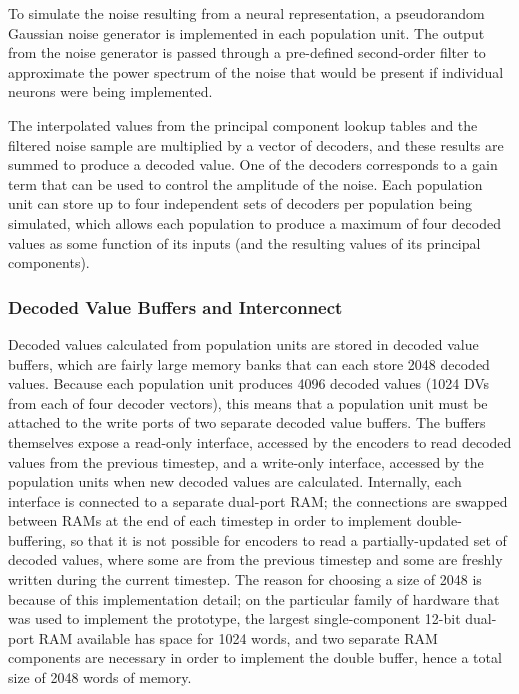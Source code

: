 \documentclass[english]{article}
\begin{document}
To simulate the noise resulting from a neural representation, a pseudorandom Gaussian noise generator is implemented in each population unit.
The output from the noise generator is passed through a pre-defined second-order filter to approximate the power spectrum of the noise
that would be present if individual neurons were being implemented. %

The interpolated values from the principal component lookup tables and the filtered noise sample are multiplied by a vector of decoders,
and these results are summed to produce a decoded value. %
One of the decoders corresponds to a gain term that can be used to control the amplitude of the noise.
Each population unit can store up to four independent sets of decoders per population being simulated,
which allows each population to produce a maximum of four decoded values as some function of its inputs
(and the resulting values of its principal components).

\subsubsection{Decoded Value Buffers and Interconnect}

Decoded values calculated from population units are stored in decoded value buffers, which are fairly large memory banks that can each
store 2048 decoded values. 
Because each population unit produces 4096 decoded values (1024 DVs from each of four decoder vectors),
this means that a population unit must be attached to the write ports of two separate decoded value buffers.
The buffers themselves expose a read-only interface, accessed by the encoders to read decoded values from the
previous timestep, and a write-only interface, accessed by the population units when new decoded values are calculated.
Internally, each interface is connected to a separate dual-port RAM; the connections are swapped between RAMs
at the end of each timestep in order to implement double-buffering, so that it is not possible for encoders to read a
partially-updated set of decoded values, where some are from the previous timestep and some are freshly written during the current timestep.
The reason for choosing a size of 2048 is because of this implementation detail; on the particular family of hardware
that was used to implement the prototype, the largest single-component 12-bit dual-port RAM available has space for 1024 words,
and two separate RAM components are necessary in order to implement the double buffer, hence a total size of 2048 words of memory.
\end{document}
